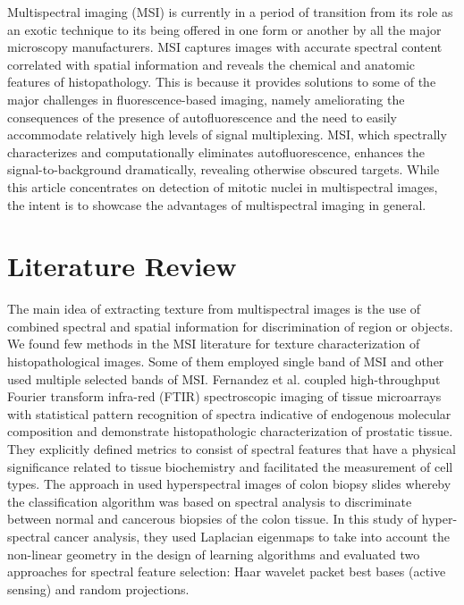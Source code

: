 \documentclass[10pt,twocolumn,letterpaper]{article}
\begin{document}
Multispectral imaging (MSI) is currently in a period of transition from its role as an exotic technique to its being offered in one form or another by all the major microscopy manufacturers. MSI captures images with accurate spectral content correlated with spatial information and reveals the chemical and anatomic features of histopathology. This is because it provides solutions to some of the major challenges in fluorescence-based imaging, namely ameliorating the consequences of the presence of autofluorescence and the need to easily accommodate relatively high levels of signal multiplexing. MSI, which spectrally characterizes and computationally eliminates autofluorescence, enhances the signal-to-background dramatically, revealing otherwise obscured targets. While this article concentrates on detection of mitotic nuclei in multispectral images, the intent is to showcase the advantages of multispectral imaging in general. 

\section{Literature Review}
The main idea of extracting texture from multispectral images is the use of combined spectral and spatial information for discrimination of region or objects. We found few methods in the MSI literature for texture characterization of histopathological images. Some of them employed single band of MSI and other used multiple selected bands of MSI. Fernandez et al. \cite{fernandez2005} coupled high-throughput Fourier transform infra-red (FTIR) spectroscopic imaging of tissue microarrays with statistical pattern recognition of spectra indicative of endogenous molecular composition and demonstrate histopathologic characterization of prostatic tissue. They explicitly defined metrics to consist of spectral features that have a physical significance related to tissue biochemistry and facilitated the measurement of cell types. The approach in \cite{woolfe2006} used hyperspectral images of colon biopsy slides whereby the classification algorithm was based on spectral analysis to discriminate between normal and cancerous biopsies of the colon tissue. In this study of hyper-spectral cancer analysis, they used Laplacian eigenmaps to take into account the non-linear geometry in the design of learning algorithms and evaluated two approaches for spectral feature selection: Haar wavelet packet best bases (active sensing) and random projections.
\end{document}
